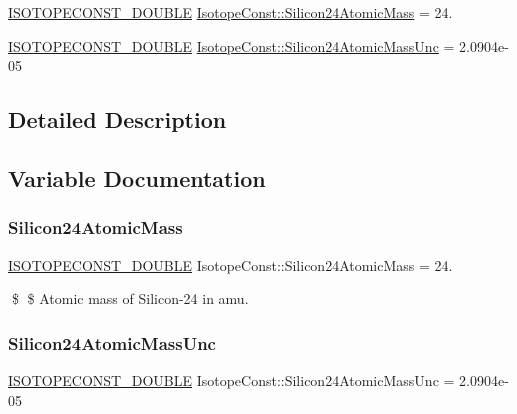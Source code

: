 \begin{DoxyCompactItemize}
\item 
\mbox{\hyperlink{group___isotope_const-_macros_ga8f45a7272ce02c0b4c65c44636ed719a}{I\+S\+O\+T\+O\+P\+E\+C\+O\+N\+S\+T\+\_\+\+D\+O\+U\+B\+LE}} \mbox{\hyperlink{group___isotope_const-_silicon-_si24_gae472123c2ca85aebaaf570bb2494ccae}{Isotope\+Const\+::\+Silicon24\+Atomic\+Mass}} = 24.
\item 
\mbox{\hyperlink{group___isotope_const-_macros_ga8f45a7272ce02c0b4c65c44636ed719a}{I\+S\+O\+T\+O\+P\+E\+C\+O\+N\+S\+T\+\_\+\+D\+O\+U\+B\+LE}} \mbox{\hyperlink{group___isotope_const-_silicon-_si24_gab8d1b3d5ca3658bd39db6817525edf81}{Isotope\+Const\+::\+Silicon24\+Atomic\+Mass\+Unc}} = 2.\+0904e-\/05
\end{DoxyCompactItemize}


\subsection{Detailed Description}


\subsection{Variable Documentation}
\mbox{\label{group___isotope_const-_silicon-_si24_gae472123c2ca85aebaaf570bb2494ccae}} 
\subsubsection{\texorpdfstring{Silicon24\+Atomic\+Mass}{Silicon24AtomicMass}}
{\footnotesize\ttfamily \mbox{\hyperlink{group___isotope_const-_macros_ga8f45a7272ce02c0b4c65c44636ed719a}{I\+S\+O\+T\+O\+P\+E\+C\+O\+N\+S\+T\+\_\+\+D\+O\+U\+B\+LE}} Isotope\+Const\+::\+Silicon24\+Atomic\+Mass = 24.}

\$ \$ Atomic mass of Silicon-\/24 in amu. \mbox{\label{group___isotope_const-_silicon-_si24_gab8d1b3d5ca3658bd39db6817525edf81}} 
\subsubsection{\texorpdfstring{Silicon24\+Atomic\+Mass\+Unc}{Silicon24AtomicMassUnc}}
{\footnotesize\ttfamily \mbox{\hyperlink{group___isotope_const-_macros_ga8f45a7272ce02c0b4c65c44636ed719a}{I\+S\+O\+T\+O\+P\+E\+C\+O\+N\+S\+T\+\_\+\+D\+O\+U\+B\+LE}} Isotope\+Const\+::\+Silicon24\+Atomic\+Mass\+Unc = 2.\+0904e-\/05}

